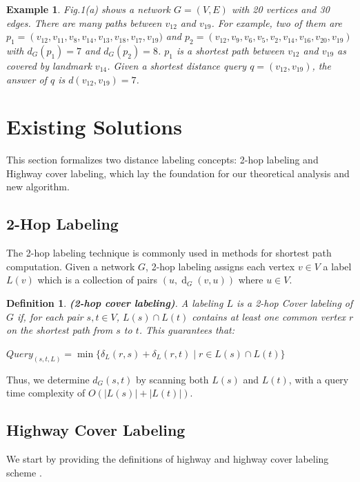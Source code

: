 \documentclass[sigconf]{acmart}
\newtheorem{definition}{Definition}
\newtheorem{example}{Example}
\begin{document}
%
%
\begin{example}
    Fig.1(a) shows a network $G=(V,E)$ with 20 vertices and 30 edges. There are many paths between $v_{12}$ and $v_{19}$. For example, two of them are $p_{1}=\left(v_{12}, v_{11}, v_{8}, v_{14}, v_{13}, v_{18},v_{17},v_{19})\right.$ and $p_{2}=\left(v_{12}, v_{9}, v_{6}, v_{5}, v_{2}, v_{14}, v_{16}, v_{20}, v_{19}\right)$ with $d_{G}(p_{1})= 7$ and $d_{G}(p_{2})=8$. $p_{1}$ is a shortest path between $v_{12}$ and $v_{19}$ as covered by landmark $v_{14}$. Given a shortest distance query $q=\left(v_{12}, v_{19}\right)$, the answer of $q$ is $d(v_{12}, v_{19})=7$.
\end{example}
%
%
\section{Existing Solutions}
\label{sec:existing_solutions}
This section formalizes two distance labeling concepts: 2-hop labeling and Highway cover labeling\cite{ref1, ref7}, which lay the foundation for our theoretical analysis and new algorithm.\par

\subsection{2-Hop Labeling}
The 2-hop labeling technique is commonly used in methods for shortest path computation\cite{ref6, ref7, ref11, ref12, ref16}. Given a network $G$, 2-hop labeling assigns each vertex $v \in V$ a label $L(v)$ which is a collection of pairs $(u, \operatorname{d}_{G}(v, u))$ where $u \in V$. \par

\begin{definition}
    \textbf{(2-hop cover labeling)}. A labeling $L$ is a 2-hop Cover labeling of $G$ if, for each pair $s, t \in V$, $L(s) \cap L(t)$ contains at least one common vertex $r$ on the shortest path from $s$ to $t$. This guarantees that:\par
    \begin{center}
        $Query_(s, t, L) = \min \{ \delta_L(r, s) + \delta_L(r, t) \mid r \in L(s) \cap L(t) \}$
    \end{center}
\end{definition}
Thus, we determine $d_G(s, t)$ by scanning both $L(s)$ and $L(t)$, with a query time complexity of $O(|L(s)| + |L(t)|)$.

%
%
\subsection{Highway Cover Labeling}
We start by providing the definitions of highway and highway cover labeling scheme \cite{ref7, ref10}.
\end{document}
